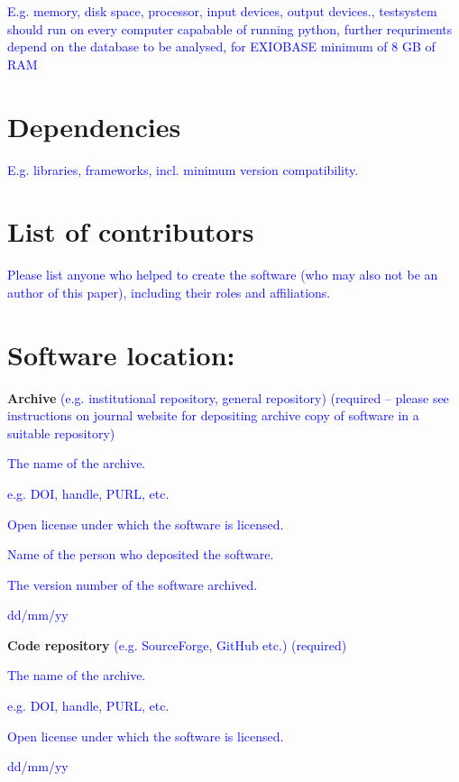 \documentclass{jors}
\begin{document}
{\textcolor{blue}{E.g. memory, disk space, processor, input devices, output devices., testsystem should run on every computer capabable of running python, further requriments depend on the database to be analysed, for EXIOBASE minimum of 8 GB of RAM}

\section*{Dependencies}

\textcolor{blue}{E.g. libraries, frameworks, incl. minimum version compatibility.}

\section*{List of contributors}

\textcolor{blue}{Please list anyone who helped to create the software (who may also not be an author of this paper), including their roles and affiliations.}

\section*{Software location:}

{\bf Archive} \textcolor{blue}{(e.g. institutional repository, general repository) (required – please see instructions on journal website for depositing archive copy of software in a suitable repository)} 

\begin{description}[noitemsep,topsep=0pt]
	\item[Name:] \textcolor{blue}{The name of the archive.}
	\item[Persistent identifier:] \textcolor{blue}{e.g. DOI, handle, PURL, etc.}
	\item[Licence:] \textcolor{blue}{Open license under which the software is licensed.}
	\item[Publisher:]  \textcolor{blue}{Name of the person who deposited the software.}
	\item[Version published:] \textcolor{blue}{The version number of the software archived.}
	\item[Date published:] \textcolor{blue}{dd/mm/yy}
\end{description}



{\bf Code repository} \textcolor{blue}{(e.g. SourceForge, GitHub etc.) (required)}

\begin{description}[noitemsep,topsep=0pt]
	\item[Name:] \textcolor{blue}{The name of the archive.}
	\item[Persistent identifier:] \textcolor{blue}{e.g. DOI, handle, PURL, etc.}
	\item[Licence:] \textcolor{blue}{Open license under which the software is licensed.}
	\item[Date published:] \textcolor{blue}{dd/mm/yy}
\end{description}

}
\end{document}
